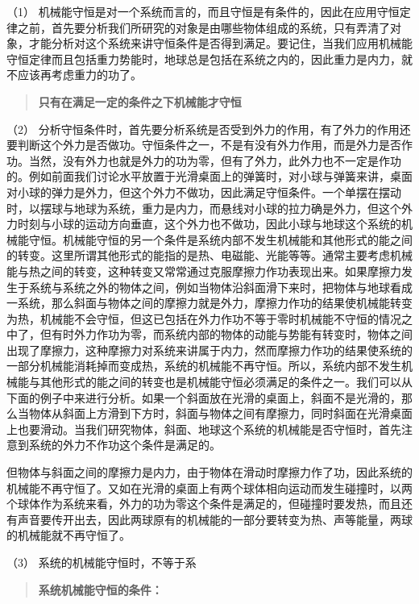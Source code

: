 （1）
机械能守恒是对一个系统而言的，而且守恒是有条件的，因此在应用守恒定律之前，首先要分析我们所研究的对象是由哪些物体组成的系统，只有弄清了对象，才能分析对这个系统来讲守恒条件是否得到满足。要记住，当我们应用机械能守恒定律而且包括重力势能时，地球总是包括在系统之内的，因此重力是内力，就不应该再考虑重力的功了。

\begin{quote}
\textbf{只有在满足一定的条件之下机械能才守恒}
\end{quote}

（2）
分析守恒条件时，首先要分析系统是否受到外力的作用，有了外力的作用还要判断这个外力是否做功。守恒条件之一，不是有没有外力作用，而是外力是否作功。当然，没有外力也就是外力的功为零，但有了外力，此外力也不一定是作功的。例如前面我们讨论水平放置于光滑桌面上的弹簧时，对小球与弹簧来讲，桌面对小球的弹力是外力，但这个外力不做功，因此满足守恒条件。一个单摆在摆动时，以摆球与地球为系统，重力是内力，而悬线对小球的拉力确是外力，但这个外力时刻与小球的运动方向垂直，这个外力也不做功，因此小球与地球这个系统的机械能守恒。机械能守恒的另一个条件是系统内部不发生机械能和其他形式的能之间的转变。这里所谓其他形式的能指的是热、电磁能、光能等等。通常主要考虑机械能与热之间的转变，这种转变又常常通过克服摩擦力作功表现出来。如果摩擦力发生于系统与系统之外的物体之间，例如当物体沿斜面滑下来时，把物体与地球看成一系统，那么斜面与物体之间的摩擦力就是外力，摩擦力作功的结果使机械能转变为热，机械能不会守恒，但这已包括在外力作功不等于零时机械能不守恒的情况之中了，但有时外力作功为零，而系统内部的物体的动能与势能有转变时，物体之间出现了摩擦力，这种摩擦力对系统来讲属于内力，然而摩擦力作功的结果使系统的一部分机械能消耗掉而变成热，系统的机械能不再守恒。所以，系统内部不发生机械能与其他形式的能之间的转变也是机械能守恒必须满足的条件之一。我们可以从下面的例子中来进行分析。如果一个斜面放在光滑的桌面上，斜面不是光滑的，那么当物体从斜面上方滑到下方时，斜面与物体之间有摩擦力，同时斜面在光滑桌面上也要滑动。当我们研究物体，斜面、地球这个系统的机械能是否守恒时，首先注意到系统的外力不作功这个条件是满足的。

但物体与斜面之间的摩擦力是内力，由于物体在滑动时摩擦力作了功，因此系统的机械能不再守恒了。又如在光滑的桌面上有两个球体相向运动而发生碰撞时，以两个球体作为系统来看，外力的功为零这个条件是满足的，但碰撞时要发热，而且还有声音要传开出去，因此两球原有的机械能的一部分要转变为热、声等能量，两球的机械能就不再守恒了。

（3） 系统的机械能守恒时，不等于系

\begin{quote}
\textbf{系统机械能守恒的条件：}
\end{quote}

